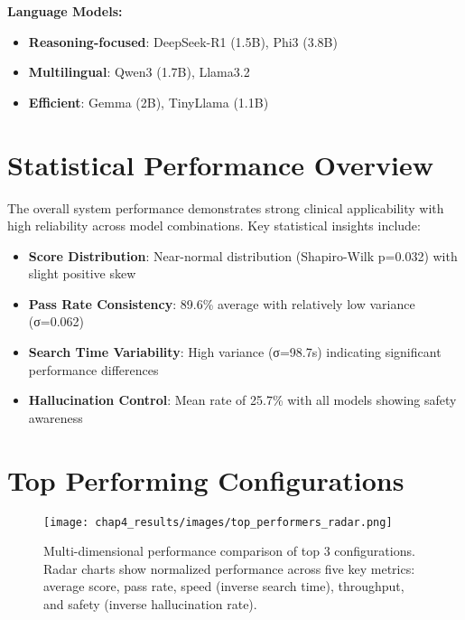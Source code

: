 \textbf{Language Models:}
\begin{itemize}
    \item \textbf{Reasoning-focused}: DeepSeek-R1 (1.5B), Phi3 (3.8B)
    \item \textbf{Multilingual}: Qwen3 (1.7B), Llama3.2
    \item \textbf{Efficient}: Gemma (2B), TinyLlama (1.1B)
\end{itemize}

\section{Statistical Performance Overview}



The overall system performance demonstrates strong clinical applicability with high reliability across model combinations. Key statistical insights include:

\begin{itemize}
    \item \textbf{Score Distribution}: Near-normal distribution (Shapiro-Wilk p=0.032) with slight positive skew
    \item \textbf{Pass Rate Consistency}: 89.6\% average with relatively low variance (σ=0.062)
    \item \textbf{Search Time Variability}: High variance (σ=98.7s) indicating significant performance differences
    \item \textbf{Hallucination Control}: Mean rate of 25.7\% with all models showing safety awareness
\end{itemize}

\section{Top Performing Configurations}



\begin{figure}[!htbp]
    \centering
    \texttt{[image: chap4\_results/images/top\_performers\_radar.png]}
    \caption{Multi-dimensional performance comparison of top 3 configurations. Radar charts show normalized performance across five key metrics: average score, pass rate, speed (inverse search time), throughput, and safety (inverse hallucination rate).}
    \label{fig:top_performers_radar}
\end{figure}

